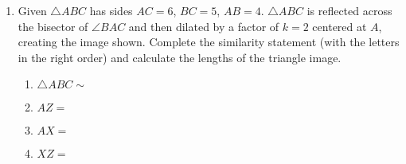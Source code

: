 \documentclass[12pt, twoside]{article}
\begin{document}
\begin{enumerate}
\newpage
  \item Given $\triangle ABC$ has sides $AC = 6$, $BC = 5$, $AB = 4$. $\triangle ABC$ is reflected across the bisector of $\angle BAC$ and then dilated by a factor of $k=2$ centered at $A$, creating the image shown. Complete the similarity statement (with the letters in the right order) and calculate the lengths of the triangle image.
  \begin{multicols}{2}
    \begin{enumerate}
      \item $\triangle ABC \sim$ \vspace{0.3cm}
      \item $AZ=$ \vspace{0.3cm}
      \item $AX=$ \vspace{0.3cm}
      \item $XZ=$
    \end{enumerate}
        \begin{flushright}
      \end{flushright}
    \end{multicols} \vspace{1cm}
  

\end{enumerate}
\end{document}
